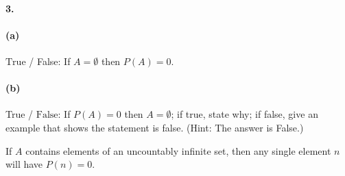     \paragraph*{3.}

    \paragraph*{(a)}
    $\boxed{\text{True}}$ / False: If $A = \emptyset$ then $P (A) = 0$.

    \paragraph*{(b)}
    True / $\boxed{\text{False}}$: If $P (A) = 0$ then $A = \emptyset$; if true, state why; if false, give an example that shows the statement is false. (Hint: The answer is False.)

    \begin{mdframed}
        If $A$ contains elements of an uncountably infinite set, then any single element $n$ will have $P(n) = 0$.
    \end{mdframed}

